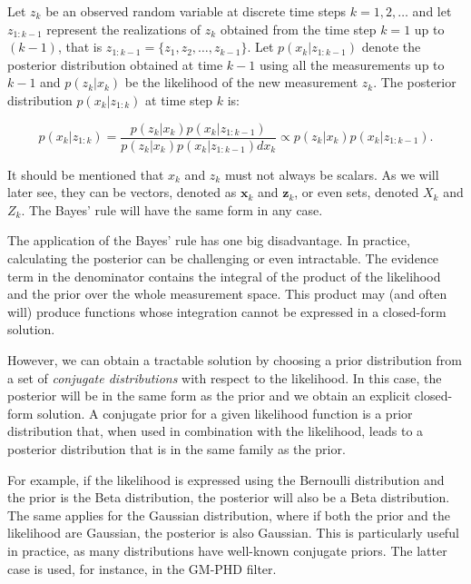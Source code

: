 \begin{theorem}
    Let $z_k$ be an observed random variable at discrete time steps
    $k = 1, 2, \ldots$ and let $z_{1:k-1}$ represent the realizations of $z_k$ 
    obtained from the time step $k = 1$ up to $(k-1)$, that is $z_{1:k-1} = 
    \{z_1, z_2,\ldots, z_{k-1}\}$. Let $p(x_k | z_{1:k-1})$ denote the posterior 
    distribution obtained at time $k-1$ using all the measurements up to $k-1$ 
    and $p(z_k | x_k)$ be the likelihood of the new measurement $z_k$. The 
    posterior distribution $p(x_k | z_{1:k})$ at time step $k$ is:

    \begin{equation}
    p(x_k | z_{1:k}) 
        = \frac
            { p(z_k | x_k) p(x_k | z_{1:k-1}) }
            { p(z_k | x_k) p(x_k | z_{1:k-1}) dx_k }
        \propto p(z_k | x_k) p(x_k | z_{1:k-1}).
    \end{equation}
\end{theorem}

It should be mentioned that $x_k$ and $z_k$ must not always be scalars. As we
will later see, they can be vectors, denoted as $\mathbf{x}_k$ and 
$\mathbf{z}_k$, or even sets, denoted $X_k$ and $Z_k$. The Bayes' rule will
have the same form in any case.

The application of the Bayes' rule has one big disadvantage. In practice, 
calculating the posterior can be challenging or even intractable. The evidence 
term in the denominator contains the integral of the product of the likelihood 
and the prior over the whole measurement space. This product may (and often 
will) produce functions whose integration cannot be expressed in a closed-form 
solution.

However, we can obtain a tractable solution by choosing a prior distribution 
from a set of \textit{conjugate distributions} with respect to the likelihood. 
In this case, the posterior will be in the same form as the prior and we obtain 
an explicit closed-form solution. A conjugate prior for a given likelihood 
function is a prior distribution that, when used in combination with the 
likelihood, leads to a posterior distribution that is in the same family as the 
prior.

For example, if the likelihood is expressed using the Bernoulli distribution 
and the prior is the Beta distribution, the posterior will also be a Beta 
distribution. The same applies for the Gaussian distribution, where if both the 
prior and the likelihood are Gaussian, the posterior is also Gaussian. This is 
particularly useful in practice, as many distributions have well-known 
conjugate priors. The latter case is used, for instance, in the GM-PHD filter.
